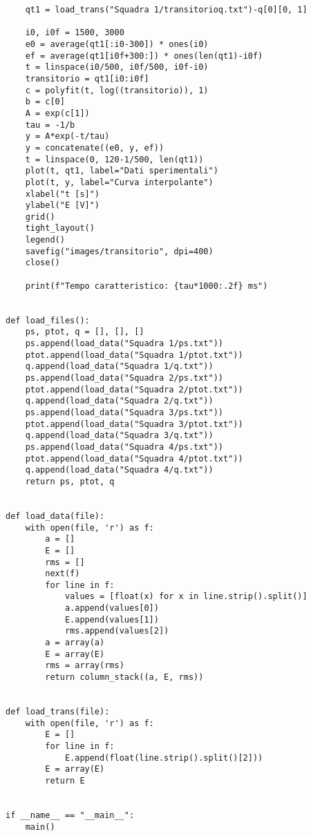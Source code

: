 \begin{lstlisting}
    qt1 = load_trans("Squadra 1/transitorioq.txt")-q[0][0, 1]

    i0, i0f = 1500, 3000
    e0 = average(qt1[:i0-300]) * ones(i0)
    ef = average(qt1[i0f+300:]) * ones(len(qt1)-i0f)
    t = linspace(i0/500, i0f/500, i0f-i0)
    transitorio = qt1[i0:i0f]
    c = polyfit(t, log((transitorio)), 1)
    b = c[0]
    A = exp(c[1])
    tau = -1/b
    y = A*exp(-t/tau)
    y = concatenate((e0, y, ef))
    t = linspace(0, 120-1/500, len(qt1))
    plot(t, qt1, label="Dati sperimentali")
    plot(t, y, label="Curva interpolante")
    xlabel("t [s]")
    ylabel("E [V]")
    grid()
    tight_layout()
    legend()
    savefig("images/transitorio", dpi=400)
    close()

    print(f"Tempo caratteristico: {tau*1000:.2f} ms")


def load_files():
    ps, ptot, q = [], [], []
    ps.append(load_data("Squadra 1/ps.txt"))
    ptot.append(load_data("Squadra 1/ptot.txt"))
    q.append(load_data("Squadra 1/q.txt"))
    ps.append(load_data("Squadra 2/ps.txt"))
    ptot.append(load_data("Squadra 2/ptot.txt"))
    q.append(load_data("Squadra 2/q.txt"))
    ps.append(load_data("Squadra 3/ps.txt"))
    ptot.append(load_data("Squadra 3/ptot.txt"))
    q.append(load_data("Squadra 3/q.txt"))
    ps.append(load_data("Squadra 4/ps.txt"))
    ptot.append(load_data("Squadra 4/ptot.txt"))
    q.append(load_data("Squadra 4/q.txt"))
    return ps, ptot, q


def load_data(file):
    with open(file, 'r') as f:
        a = []
        E = []
        rms = []
        next(f)
        for line in f:
            values = [float(x) for x in line.strip().split()]
            a.append(values[0])
            E.append(values[1])
            rms.append(values[2])
        a = array(a)
        E = array(E)
        rms = array(rms)
        return column_stack((a, E, rms))


def load_trans(file):
    with open(file, 'r') as f:
        E = []
        for line in f:
            E.append(float(line.strip().split()[2]))
        E = array(E)
        return E
    

if __name__ == "__main__":
    main()
\end{lstlisting}

